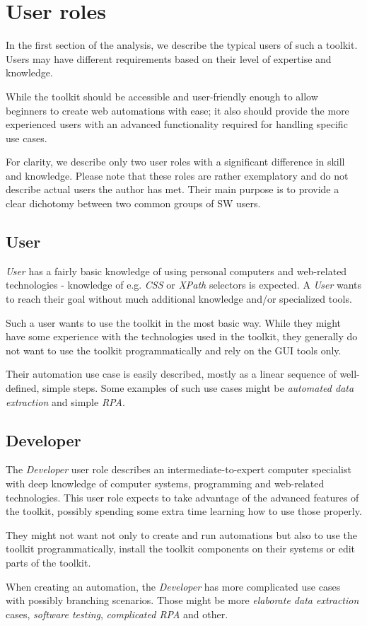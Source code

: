 \section{User roles} \label{userroles}

In the first section of the analysis, we describe the typical users of such a toolkit.
Users may have different requirements based on their level of expertise and knowledge.

While the toolkit should be accessible and user-friendly enough to allow beginners to
create web automations with ease; it also should provide the more experienced users with 
an advanced functionality required for handling specific use cases. 

For clarity, we describe only two user roles with a significant difference in skill and knowledge.
Please note that these roles are rather exemplatory and do not describe actual users the author has met.
Their main purpose is to provide a clear dichotomy between two common groups of \acl{SW} users.

\subsection{User} \label{UserUserRole}
\textit{User} has a fairly basic knowledge of using personal computers 
and web-related technologies - knowledge of e.g. \textit{CSS} or \textit{XPath} selectors is expected.
A \textit{User} wants to reach their goal without much additional knowledge and/or specialized tools.

Such a user wants to use the toolkit in the most basic way.
While they might have some experience with the technologies used in the toolkit, they generally do not want to use the toolkit programmatically and rely on the \ac{GUI} tools only.

Their automation use case is easily described, mostly as a linear sequence of well-defined, simple steps.
Some examples of such use cases might be \textit{automated data extraction} and simple \textit{\acl{RPA}}.


\subsection{Developer} \label{DevUserRole}
The \textit{Developer} user role describes an intermediate-to-expert computer specialist with deep
knowledge of computer systems, programming and web-related technologies.
This user role expects to take advantage of the advanced features of the toolkit, possibly spending some extra time learning how to use those properly.

They might not want not only to create and run automations but also to use the toolkit programmatically, 
install the toolkit components on their systems or edit parts of the toolkit. 

When creating an automation, the \textit{Developer} has more complicated use cases with possibly branching scenarios. 
Those might be more \textit{elaborate data extraction} cases, \textit{software testing}, \textit{complicated \ac{RPA}} and other.